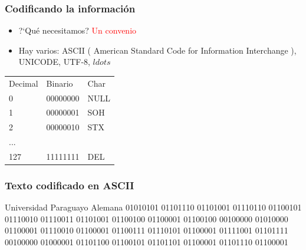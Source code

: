 \begin{frame}
    \frametitle{Codificando la informaci\'on}
    \begin{itemize}
        \item ?`Qu\'e necesitamos? \pause \textcolor{red}{Un convenio} 
        \item Hay varios: ASCII ( American Standard Code for Information Interchange ), UNICODE, UTF-8, $ldots$
    \end{itemize}

    \begin{table}[]
    \centering
    \begin{tabular}{lll}
        Decimal & Binario  & Char \\
        0       & 00000000 & NULL \\
        1       & 00000001 & SOH  \\
        2       & 00000010 & STX  \\
        ...     &          &      \\
        127     & 11111111 & DEL 
    \end{tabular}
    \end{table}
\end{frame}


\begin{frame}
    \frametitle{Texto codificado en ASCII}
    \begin{block}{Universidad Paraguayo Alemana}
        01010101 01101110 01101001 01110110 01100101 01110010 01110011 01101001 01100100 01100001 01100100 00100000 01010000 01100001 01110010 01100001 01100111 01110101 01100001 01111001 01101111 00100000 01000001 01101100 01100101 01101101 01100001 01101110 01100001 
    \end{block}
\end{frame}

